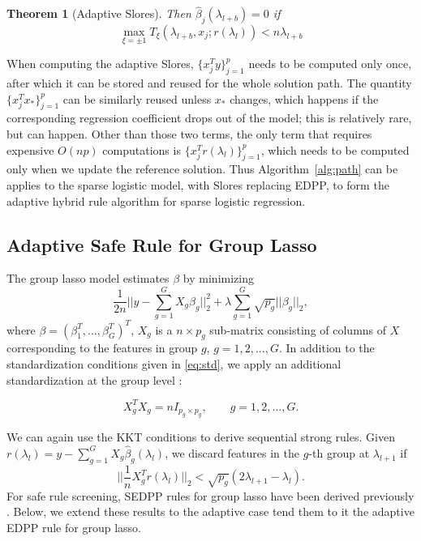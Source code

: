 \documentclass[]{interact}
\theoremstyle{plain}%
\newtheorem{theorem}{Theorem}[section]
\theoremstyle{definition}
\theoremstyle{remark}
\begin{document}
\begin{theorem}[Adaptive Slores]
Then $\hat{\beta}_j(\lambda_{l+b})=0$ if
  \begin{equation}
    \max_{\xi=\pm1} T_\xi(\lambda_{l+b},x_j;r(\lambda_l))<n\lambda_{l+b}
  \end{equation}
\end{theorem}

When computing the adaptive Slores, $\{x_j^Ty\}_{j=1}^p$ needs to be computed only once, after which it can be stored and reused for the whole solution path. The quantity $\{x_j^Tx_*\}_{j=1}^p$ can be similarly reused unless $x_*$ changes, which happens if the corresponding regression coefficient drops out of the model; this is relatively rare, but can happen. Other than those two terms, the only term that requires expensive $O(np)$ computations is $\{x_j^Tr(\lambda_l)\}_{j=1}^p$, which needs to be computed only when we update the reference solution. Thus Algorithm~\ref{alg:path} can be applies to the sparse logistic model, with Slores replacing EDPP, to form the adaptive hybrid rule algorithm for sparse logistic regression.

\subsection{Adaptive Safe Rule for Group Lasso}
\label{sec:group}

The group lasso model \citep{yuan2006model} estimates $\beta$ by minimizing
\begin{equation}
    \label{eq:glasso}
    \frac{1}{2n}\bigg|\bigg|y - \sum_{g=1}^GX_g\beta_g\bigg|\bigg|_2^2 + \lambda\sum_{g=1}^G\sqrt{p_g}||\beta_g||_2,
\end{equation}
where $\beta=(\beta_1^T,...,\beta_G^T)^T$, $X_g$ is a $n\times p_g$ sub-matrix consisting of columns of $X$ corresponding to the features in group $g$, $g=1,2,...,G$. In addition to the standardization conditions given in \eqref{eq:std}, we apply an additional standardization at the group level \citep{breheny2015group}:

\begin{equation}
    \label{eq:stdg}
    X_g^TX_g=nI_{p_g\times p_g},\qquad g=1,2,...,G.
\end{equation}

We can again use the KKT conditions to derive sequential strong rules. Given $r(\lambda_l)=y-\sum_{g=1}^GX_g\hat{\beta}_g(\lambda_l)$, we discard features in the $g$-th group at $\lambda_{l+1}$ if
\begin{equation} \bigg|\bigg|\frac{1}{n}X_g^Tr(\lambda_l)\bigg|\bigg|_2<\sqrt{p_g}(2\lambda_{l+1}-\lambda_l).
\end{equation}
For safe rule screening, SEDPP rules for group lasso have been derived previously \citep{wang2013lasso}. Below, we extend these results to the adaptive case tend them to it the adaptive EDPP rule for group lasso.
\end{document}

